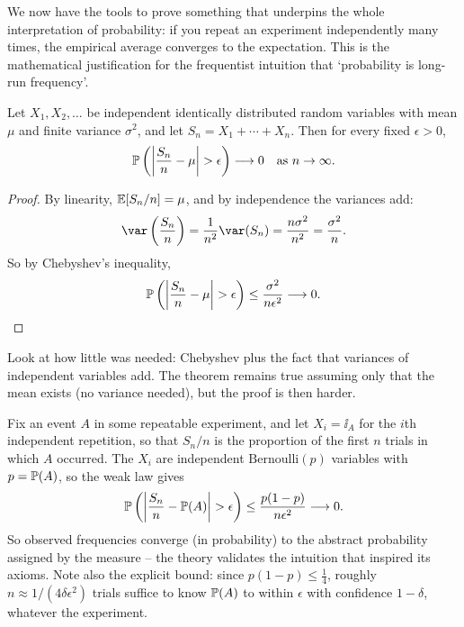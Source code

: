 \documentclass[a4paper]{scrartcl}
\begin{document}
We now have the tools to prove something that underpins the whole interpretation of probability: if you repeat an experiment independently many times, the empirical average converges to the expectation. This is the mathematical justification for the frequentist intuition that `probability is long-run frequency'.

\begin{theorem}
	Let $X_1, X_2, \dots$ be independent identically distributed random variables with mean $\mu$ and finite variance $\sigma^2$, and let $S_n = X_1 + \cdots + X_n$. Then for every fixed $\epsilon > 0$,
	$$
	\mathbb{P}\left(\left|\frac{S_n}{n} - \mu\right| > \epsilon \right) \longrightarrow 0 \quad \text{as } n \rightarrow \infty.
	$$
\end{theorem}
\begin{proof}
	By linearity, $\mathbb{E}[S_n / n] = \mu$, and by independence the variances add:
	$$
	\var\left(\frac{S_n}{n}\right) = \frac{1}{n^2}\var(S_n) = \frac{n\sigma^2}{n^2} = \frac{\sigma^2}{n}.
	$$
	So by Chebyshev's inequality,
	$$
	\mathbb{P}\left(\left|\frac{S_n}{n} - \mu\right| > \epsilon\right) \leq \frac{\sigma^2}{n\epsilon^2} \longrightarrow 0. \qedhere
	$$
\end{proof}

Look at how little was needed: Chebyshev plus the fact that variances of independent variables add. The theorem remains true assuming only that the mean exists (no variance needed), but the proof is then harder.

\begin{example}
	Fix an event $A$ in some repeatable experiment, and let $X_i = \ii_{A}$ for the $i$th independent repetition, so that $S_n / n$ is the proportion of the first $n$ trials in which $A$ occurred. The $X_i$ are independent $\mathrm{Bernoulli}(p)$ variables with $p = \mathbb{P}(A)$, so the weak law gives
	$$
	\mathbb{P}\left(\left|\frac{S_n}{n} - \mathbb{P}(A)\right| > \epsilon\right) \leq \frac{p(1-p)}{n\epsilon^2} \longrightarrow 0.
	$$
	So observed frequencies converge (in probability) to the abstract probability assigned by the measure -- the theory validates the intuition that inspired its axioms. Note also the explicit bound: since $p(1-p) \leq \frac14$, roughly $n \approx 1/(4\delta\epsilon^2)$ trials suffice to know $\mathbb{P}(A)$ to within $\epsilon$ with confidence $1 - \delta$, whatever the experiment.
\end{example}
\end{document}
